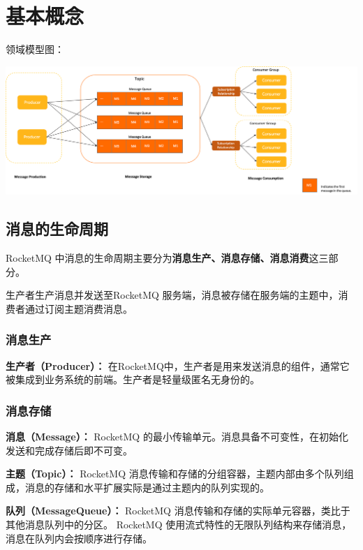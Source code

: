 \documentclass[11pt, a4paper, oneside]{ctexbook}
\let\kaishu\relax                               %
\begin{document}
\section{基本概念}
领域模型图：
\begin{center}
  \begin{minipage}{\textwidth}
    \center
    \includegraphics[width=\textwidth]{picture/领域模型图.png}
    \captionsetup{hypcap=false}
    \label{fig:领域模型图}
  \end{minipage}
\end{center}

\subsection{消息的生命周期}
RocketMQ 中消息的生命周期主要分为{\bfseries\kaishu 消息生产、消息存储、消息消费}这三部分。

生产者生产消息并发送至RocketMQ 服务端，消息被存储在服务端的主题中，消费者通过订阅主题消费消息。

\subsubsection{消息生产}
\textbf{生产者（Producer）：}
在RocketMQ中，生产者是用来发送消息的组件，通常它被集成到业务系统的前端。生产者是轻量级匿名无身份的。

\subsubsection{消息存储}
\textbf{消息（Message）：}
RocketMQ 的最小传输单元。消息具备不可变性，在初始化发送和完成存储后即不可变。

\textbf{主题（Topic）：}
RocketMQ 消息传输和存储的分组容器，主题内部由多个队列组成，消息的存储和水平扩展实际是通过主题内的队列实现的。

\textbf{队列（MessageQueue）：}
RocketMQ 消息传输和存储的实际单元容器，类比于其他消息队列中的分区。 RocketMQ 使用流式特性的无限队列结构来存储消息，消息在队列内会按顺序进行存储。
\end{document}
